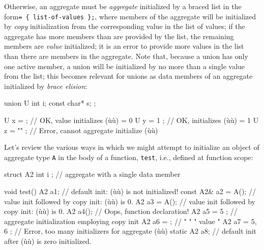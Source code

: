 \noindent Otherwise, an aggregate must be \emph{aggregate} initialized by a braced
list in the form\linebreak[4]
\lstinline!=!~\lstinline!{!~\lstinline!list-of-values!~\lstinline!};!, where members
of the aggregate will be initialized by \emph{copy} initialization from
the corresponding value in the list of values; if the aggregate has more
members than are provided by the list, the remaining members are
\emph{value} initialized; it is an error to provide more values in the
list than there are members in the aggregate. Note that, because a union
has only one active member, a union will be initialized by no more than
a single value from the list; this becomes relevant for unions as data
members of an aggregate initialized by \emph{brace elision}:

\begin{emcppslisting}
union U
{
    int i;
    const char* s;
};

U x = {    };  // OK, value initializes (ù{}ù) = 0
U y = { 1  };  // OK, initializes (ù{}ù) = 1
U z = { "" };  // Error, cannot aggregate initialize (ù{}ù)
\end{emcppslisting}


\noindent Let's review the various ways in which we might attempt to initialize an
object of aggregate type \lstinline!A! in the body of a function,
\lstinline!test!, i.e., defined at function scope:

\begin{emcppslisting}
struct A2 { int i };  // aggregate with a single data member

void test()
{
           A2  a1;             // default init: (ù{}ù) is not initialized!
    const  A2& a2 = A();       // value init followed by copy init: (ù{}ù) is 0.
           A2  a3 = A();       // value init followed by copy init: (ù{}ù) is 0.
           A2  a4();           // Oops, function declaration!
           A2  a5 = { 5 };     // aggregate initialization employing copy init
           A2  a6 = { };       //    "            "            "     value  "
           A2  a7 = { 5, 6 };  // Error, too many initializers for aggregate (ù{}ù)
    static A2  a8;             // default init after (ù{}ù) is zero initialized.
}
\end{emcppslisting}


